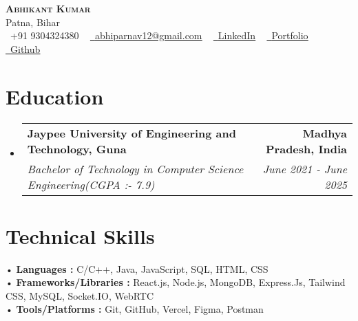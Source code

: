 \documentclass[letterpaper,11pt]{article}
\makeatletter
\newcommand{\resumeSubheading}[4]{
  \vspace{-2pt}\item
	\begin{tabular*}{1.0\textwidth}[t]{l@{\extracolsep{\fill}}r}
  	\textbf{#1} & \textbf{\small #2} \\
  	\textit{\small#3} & \textit{\small #4} \\
	\end{tabular*}\vspace{-7pt}
}
\newcommand{\resumeSubHeadingListStart}{\begin{itemize}[leftmargin=0.0in, label={}]}
\newcommand{\resumeSubHeadingListEnd}{\end{itemize}}
\makeatother
\begin{document}
 

\begin{center}
	{\Huge  {\scshape \textbf{Abhikant Kumar}}} \\ \vspace{3pt}
	Patna, Bihar  \\ \vspace{3pt}
	\small \raisebox{-0.1\height}\faPhone\ +91 9304324380 ~ \href{mailto:x@gmail.com}{\raisebox{-0.2\height}\faEnvelope\  \underline{abhiparnav12@gmail.com}} ~
	\href{https://linkedin.com/in//}{\raisebox{-0.2\height}\faLinkedin\ \underline{LinkedIn}} ~
   \href{https://abhikant-portfolio.netlify.app/}{\raisebox{-0.2\height}\faGlobe\ \underline{Portfolio}} ~ \href{https://github.com/abhikant12}{\raisebox{-0.2\height}\faGithub\ \underline{Github}}
\end{center}


 
\section{Education}
\begin{itemize}[leftmargin=0.12in, label={}]
  \vspace{-9pt}
  \resumeSubHeadingListStart
    \resumeSubheading
    {Jaypee University of Engineering and Technology, Guna}{Madhya Pradesh, India}
    {Bachelor of Technology in Computer Science Engineering(CGPA  :-  7.9)}{June 2021 - June 2025}
   \vspace{-1pt}
  \resumeSubHeadingListEnd
\end{itemize} 



\section{Technical Skills }
 \begin{itemize}[leftmargin=0.12in, label={}]
        \vspace{-2pt}
    \small{\item{
    \hspace{-5pt}• \textbf{Languages : }{ C/C++, Java, JavaScript, SQL, HTML, CSS } \\  \vspace{3pt}
        \hspace{-5pt}• \textbf{Frameworks/Libraries :}  {React.js, Node.js, MongoDB, Express.Js, Tailwind CSS,  MySQL, Socket.IO, WebRTC   } \\  \vspace{3pt}
        \hspace{-5pt}• \textbf{Tools/Platforms :}  {Git, GitHub, Vercel, Figma, Postman} \\
    }}
 \end{itemize}
 \vspace{-13pt}
\end{document}
